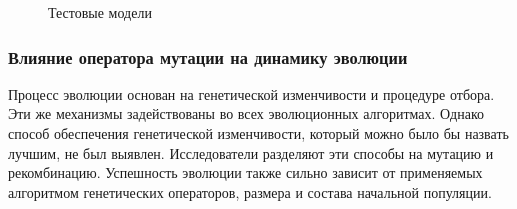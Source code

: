 \begin{figure} [h]
  \center
  \begin{subfigure}[t]{0.3\linewidth}
    \center
  \end{subfigure}
  \begin{subfigure}[t]{0.3\linewidth}
    \center
  \end{subfigure}
  \begin{subfigure}[t]{0.3\linewidth}
    \center
  \end{subfigure}
  \caption{Тестовые модели}
  \label{img:functionz}
\end{figure}


\subsubsection{Влияние оператора мутации на динамику эволюции}

Процесс эволюции основан на генетической изменчивости и процедуре отбора. Эти же механизмы задействованы во всех эволюционных алгоритмах. Однако способ обеспечения генетической изменчивости, который можно было бы назвать лучшим, не был выявлен. Исследователи разделяют эти способы на мутацию и рекомбинацию. Успешность эволюции также сильно зависит от применяемых алгоритмом генетических операторов, размера и состава начальной популяции.

